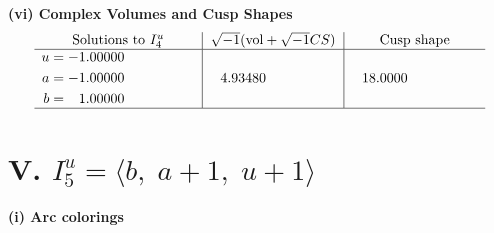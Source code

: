 \documentclass[1p]{elsarticle_modified}
\theoremstyle{definition}
\newcommand{\I}{\sqrt{-1}}
\begin{document}
\newpage\flushleft \textbf{(vi) Complex Volumes and Cusp Shapes}
$$\begin{array}{c|c|c}  
\text{Solutions to }I^u_{4}& \I (\text{vol} + \sqrt{-1}CS) & \text{Cusp shape}\\
 \hline 
\begin{aligned}
u &= -1.00000\phantom{ +0.000000I} \\
a &= -1.00000\phantom{ +0.000000I} \\
b &= \phantom{-}1.00000\phantom{ +0.000000I}\end{aligned}
 & \phantom{-}4.93480\phantom{ +0.000000I} & \phantom{-}18.0000\phantom{ +0.000000I}\\
 \hline 
 \end{array}$$\newpage\newpage\renewcommand{\arraystretch}{1}
\centering \section*{V. $I^u_{5}= \langle b,\;a+1,\;u+1 \rangle$}
\flushleft \textbf{(i) Arc colorings}\\
\end{document}
